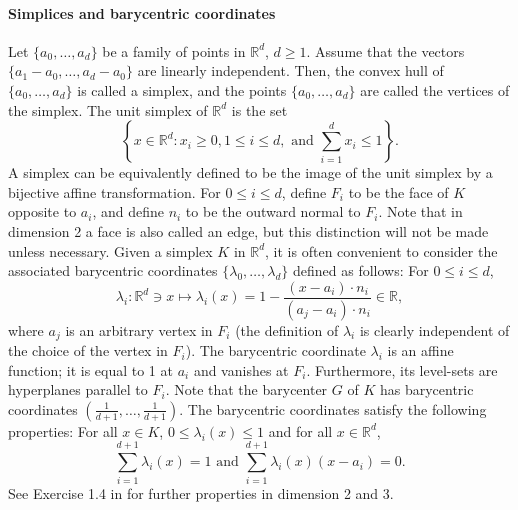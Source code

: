 \paragraph{Simplices and barycentric coordinates} Let $\{a_0, \dots, a_d\}$ be a family of points in $\mathbb{R}^d$, $d \ge 1$. Assume that the vectors $\{a_1 - a_0, \dots, a_d - a_0\}$ are linearly independent. Then, the convex hull of $\{a_0, \dots, a_d\}$ is called a simplex, and the points $\{a_0, \dots, a_d\}$ are called the vertices of the simplex. The unit simplex of $\mathbb{R}^d$ is the set
\begin{equation*}
\left\{x \in \mathbb{R}^d: x_i \ge 0, 1 \le i \le d, \text{ and } \sum_{i=1}^d x_i \le 1 \right\}.
\end{equation*}
A simplex can be equivalently defined to be the image of the unit simplex by a bijective affine transformation. For $0 \le i \le d$, define $F_i$ to be the face of $K$ opposite to $a_i$, and define $n_i$ to be the outward normal to $F_i$. Note that in dimension 2 a face is also called an edge, but this distinction will not be made unless necessary.
Given a simplex $K$ in $\mathbb{R}^d$, it is often convenient to consider the associated barycentric coordinates $\{\lambda_0, \dots, \lambda_d\}$ defined as follows: For $0 \le i \le d$,
\begin{equation*}\label{eq:barycentric_coords}
    \lambda_i: \mathbb{R}^d \ni x \mapsto \lambda_i(x) = 1 - \frac{(x - a_i) \cdot n_i}{(a_j - a_i) \cdot n_i} \in \mathbb{R},
\end{equation*}
where $a_j$ is an arbitrary vertex in $F_i$ (the definition of $\lambda_i$ is clearly independent of the choice of the vertex in $F_i$). The barycentric coordinate $\lambda_i$ is an affine function; it is equal to 1 at $a_i$ and vanishes at $F_i$. Furthermore, its level-sets are hyperplanes parallel to $F_i$. Note that the barycenter $G$ of $K$ has barycentric coordinates $(\frac{1}{d+1}, \dots, \frac{1}{d+1})$. The barycentric coordinates satisfy the following properties: For all $x \in K$, $0 \le \lambda_i(x) \le 1$ and for all $x \in \mathbb{R}^d$,
\begin{equation*}
\sum_{i=1}^{d+1} \lambda_i(x) = 1 \text{ and } \sum_{i=1}^{d+1} \lambda_i(x) (x - a_i) = 0.
\end{equation*}
See Exercise 1.4 in \cite{ern2004theory} for further properties in dimension 2 and 3.


